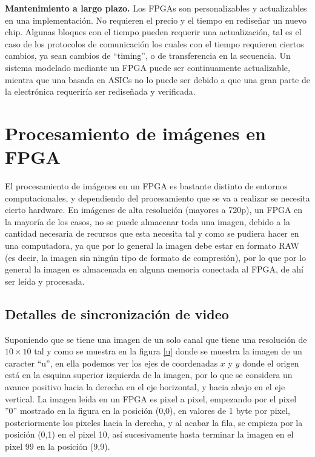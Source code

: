 \documentclass[twoside,spanish,ESP,MSc]{plantillaLabUPV}
\theoremstyle{definition}
\newcommand{\fs}{FPGAs }
\begin{document}
\checkmark\textbf{Mantenimiento a largo plazo.} Los \fs son personalizables y actualizables en una implementación. No requieren el precio y el tiempo en rediseñar un nuevo chip. Algunas bloques con el tiempo pueden requerir una actualización, tal es el caso de los protocolos de comunicación los cuales con el tiempo requieren ciertos cambios, ya sean cambios de ``timing'', o de transferencia en la secuencia. Un sistema modelado mediante un FPGA puede ser continuamente actualizable, mientra que una basada en ASICs no lo puede ser debido a que una gran parte de la electrónica requeriría ser rediseñada y verificada. 



\section{Procesamiento de imágenes en FPGA}

El procesamiento de imágenes en un FPGA es bastante distinto de entornos computacionales, y dependiendo del procesamiento que se va a realizar se necesita cierto hardware. En imágenes de alta resolución (mayores a 720p), un FPGA en la mayoría de los casos, no se puede almacenar toda una imagen, debido a la cantidad necesaria de recursos que esta necesita tal y como se pudiera hacer en una computadora, ya que por lo general la imagen debe estar en formato RAW (es decir, la imagen sin ningún tipo de formato de compresión), por lo que por lo general la imagen es almacenada en alguna memoria conectada al FPGA, de ahí ser leída y procesada.

\subsection*{Detalles de sincronización de video}
Suponiendo que se tiene una imagen de un solo canal que tiene una resolución de $10\times10$ tal y como se muestra en la figura \ref{u} donde se muestra la imagen de un caracter ``u'', en ella podemos ver los ejes de coordenadas $x$ y $y$ donde el origen está en la esquina superior izquierda de la imagen, por lo que se considera un avance positivo hacia la derecha en el eje horizontal, y hacia abajo en el eje vertical. La imagen leída en un FPGA es pixel a pixel, empezando por el pixel ''0'' mostrado en la figura en la posición (0,0), en valores de 1 byte por pixel, posteriormente los pixeles hacia la derecha, y al acabar la fila, se empieza por la posición (0,1) en el pixel 10, así sucesivamente hasta terminar la imagen en el pixel 99 en la posición (9,9).
\end{document}
